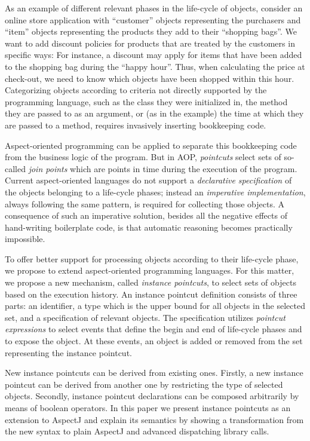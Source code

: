 As an example of different relevant phases in the life-cycle of objects, consider an online store application with ``customer'' objects representing the purchasers and ``item'' objects representing the products they add to their ``shopping bags''. We want to add discount policies for products that are treated by the customers in specific ways: For instance, a discount may apply for items that have been added to the shopping bag during the ``happy hour''. Thus, when calculating the price at check-out, we need to know which objects have been shopped within this hour.
Categorizing objects according to criteria not directly supported by the programming language, such as the class they were initialized in, the method they are passed to as an argument, or (as in the example) the time at which they are passed to a method, requires invasively inserting bookkeeping code.

Aspect-oriented programming can be applied to separate this bookkeeping code from the business logic of the program. But in AOP, \emph{pointcuts} select sets of so-called \emph{join points} which are points in time during the execution of the program. Current aspect-oriented languages do not support a \emph{declarative specification} of the objects belonging to a life-cycle phases; instead an \emph{imperative implementation}, always following the same pattern, is required for collecting those objects.
A consequence of such an imperative solution, besides all the negative effects of hand-writing boilerplate code, is that automatic reasoning becomes practically impossible. 

To offer better support for processing objects according to their life-cycle phase, we propose to extend aspect-oriented programming languages.
For this matter, we propose a new mechanism, called \emph{instance pointcuts}, to select sets of objects based on the execution history.
An instance pointcut definition consists of three parts: an identifier, a type which is the upper bound for all objects in the selected set, and a specification of relevant objects.
The specification utilizes \emph{pointcut expressions} to select events that define the begin and end of life-cycle phases and to expose the object. At these events, an object is added or removed from the set representing the instance pointcut.

New instance pointcuts can be derived from existing ones. Firstly, a new instance pointcut can be derived from another one by restricting the type of selected objects. 
Secondly, instance pointcut declarations can be composed arbitrarily by means of boolean operators. In this paper we present instance pointcuts as an extension to AspectJ \cite{kiczales2001overview} and explain its semantics by showing a transformation from the new syntax to plain AspectJ and advanced dispatching library calls. 


